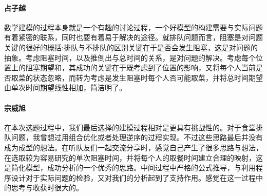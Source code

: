 \documentclass[lang=cn,10pt,a4paper]{elegantpaper}
\begin{document}
\paragraph{占子越}
数学建模的过程本身就是一个有趣的讨论过程，一个好模型的构建需要与实际问题有着紧密的联系，同时也要有着易于解决的途径。就排队问题而言，阻塞是对问题关键的很好的概括:排队与不排队的区别关键在于是否会发生阻塞，这是对问题的抽象。考虑阻塞时间，以及推倒出与总时间的关系，是对问题的解决。考虑每个位置上的阻塞期望和，其成功的关键在于既考虑到了位置的影响，又将每个人当前是否取菜的状态忽略，而转为考虑是发生阻塞时每个人否可能取菜，并将总时间期望由单次时间期望线性相加，简洁明了。
\paragraph{宗威旭}
在本次选题过程中，我们最后选择的建模过程相对是更具有挑战性的。对于食堂排队问题，我曾想过用组合优化或者处理逆序的过程实现。不过这些思路最后并没有成为成型的想法。在听队友们一起交流分享时，感觉自己产生了很多思路与想法，在选取较为容易研究的单次阻塞时间，并将每个人的取餐时间建立合理的映射，这是简化模型，成功分析的一个优秀的思路。中间过程中严格的公式推导，与利用程序设计对于实际问题的检验，又对我们的分析起到了支持作用。感觉在这一过程中的思考与收获时很大的。
\end{document}
